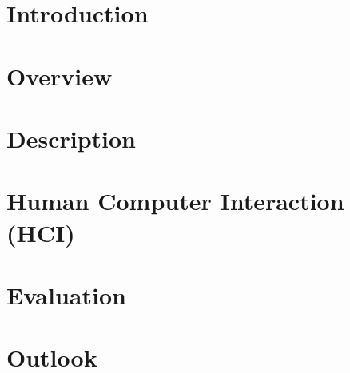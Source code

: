 \documentclass[a4paper]{article}
\begin{document}
	
	
	
	\clearpage
	
	\tableofcontents
	\clearpage
	
	\section{Introduction}
	
	
	\section{Overview}
	
		
	\section{Description}
	
		
	\section{Human Computer Interaction (HCI)}
	
		
	\section{Evaluation}
	
		
	\section{Outlook}
	
	
	\clearpage
	{}
	
	
\end{document}
